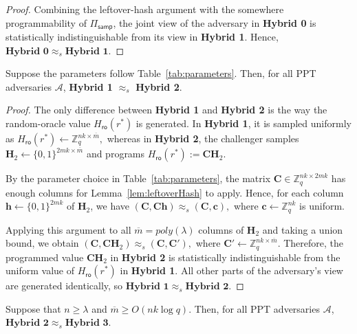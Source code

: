 \begin{proof}
Combining the leftover-hash argument with the somewhere programmability of
$\Pi_{\mathsf{samp}}$, the joint view of the adversary in \textbf{Hybrid 0}
is statistically indistinguishable from its view in \textbf{Hybrid 1}.
Hence,
$
    \textbf{Hybrid 0}\approx_s \textbf{Hybrid 1}.
$
\end{proof}

\noindent\begin{lemma}
Suppose the parameters follow Table~\ref{tab:parameters}. Then, for all
PPT adversaries $\mathcal A$, \textbf{Hybrid 1} $\approx_s$ \textbf{Hybrid 2}.

\end{lemma}

\noindent\begin{proof}
The only difference between \textbf{Hybrid 1} and \textbf{Hybrid 2} is the
way the random-oracle value $H_{\mathsf{ro}}(r^\ast)$ is generated. In
\textbf{Hybrid 1}, it is sampled uniformly as
$
    H_{\mathsf{ro}}(r^\ast)
    \gets
    \mathbb Z_q^{nk\times \overline m},
$
whereas in \textbf{Hybrid 2}, the challenger samples
$
    \mathbf H_2 \gets \{0,1\}^{2mk\times \overline m}
$
and programs
$
    H_{\mathsf{ro}}(r^\ast)
    :=
    \mathbf C\mathbf H_2.
$

By the parameter choice in Table~\ref{tab:parameters}, the matrix
$\mathbf C\in \mathbb Z_q^{nk\times 2mk}$ has enough columns for
Lemma~\ref{lem:leftoverHash} to apply. Hence, for each column
$\mathbf h\gets\{0,1\}^{2mk}$ of $\mathbf H_2$, we have
$
    (\mathbf C,\mathbf C\mathbf h)
    \approx_s
    (\mathbf C,\mathbf c),
$
where $\mathbf c\gets\mathbb Z_q^{nk}$ is uniform.

Applying this argument to all $\overline m=poly(\lambda)$ columns of
$\mathbf H_2$ and taking a union bound, we obtain
$
    (\mathbf C,\mathbf C\mathbf H_2)
    \approx_s
    (\mathbf C,\mathbf C'),
$
where
$
    \mathbf C'\gets\mathbb Z_q^{nk\times \overline m}.
$
Therefore, the programmed value $\mathbf C\mathbf H_2$ in
\textbf{Hybrid 2} is statistically indistinguishable from the uniform
value of $H_{\mathsf{ro}}(r^\ast)$ in \textbf{Hybrid 1}. All other parts
of the adversary's view are generated identically, so
$
    \textbf{Hybrid 1}\approx_s \textbf{Hybrid 2}.
$
\end{proof}
\noindent\begin{lemma}
Suppose that $n\ge \lambda$ and
$\overline{m}\ge O(nk\log q)$. Then, for all PPT adversaries
$\mathcal A$,
$
    \textbf{Hybrid 2} \approx_s \textbf{Hybrid 3}.
$
\end{lemma}

